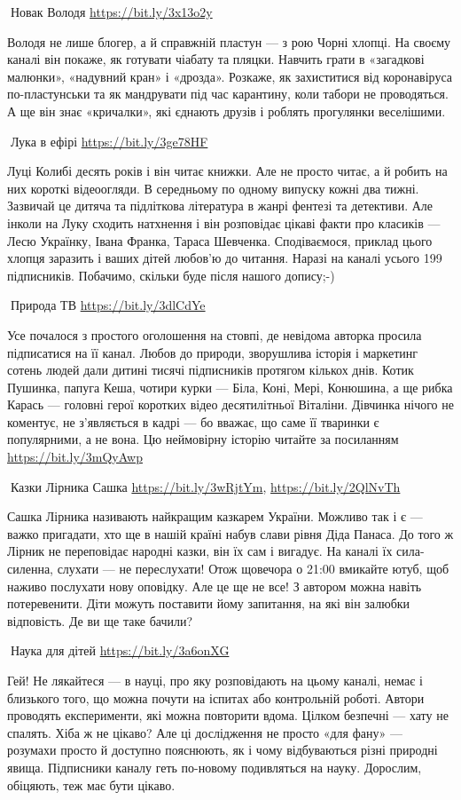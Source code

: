 🦉Новак Володя \url{https://bit.ly/3x13o2y}

Володя не лише блогер, а й справжній пластун — з рою Чорні хлопці. На своєму каналі він покаже, як готувати чіабату та пляцки. Навчить грати в «загадкові малюнки», «надувний кран» і «дрозда». Розкаже, як захиститися від коронавіруса по-пластунськи та як мандрувати під час карантину, коли табори не проводяться. А ще він знає «кричалки», які єднають друзів і роблять прогулянки веселішими.

🦉Лука в ефірі \url{https://bit.ly/3ge78HF}

Луці Колибі десять років і він читає книжки. Але не просто читає, а й робить на них короткі відеоогляди. В середньому по одному випуску кожні два тижні. Зазвичай це дитяча та підліткова література в жанрі фентезі та детективи. Але інколи на Луку сходить натхнення і він розповідає цікаві факти про класиків — Лесю Українку, Івана Франка, Тараса Шевченка. Сподіваємося, приклад цього хлопця заразить і ваших дітей любов’ю до читання. Наразі на каналі усього 199 підписників. Побачимо, скільки буде після нашого допису;-)

🦉Природа ТВ \url{https://bit.ly/3dlCdYe}

Усе почалося з простого оголошення на стовпі, де невідома авторка просила підписатися на її канал. Любов до природи, зворушлива історія і маркетинг сотень людей дали дитині тисячі підписників протягом кількох днів. Котик Пушинка, папуга Кеша, чотири курки — Біла, Коні, Мері, Конюшина, а ще рибка Карась — головні герої коротких відео десятилітньої Віталіни. Дівчинка нічого не коментує, не з’являється в кадрі — бо вважає, що саме її тваринки є популярними, а не вона. Цю неймовірну історію читайте за посиланням \url{https://bit.ly/3mQyAwp}

🦉Казки Лірника Сашка \url{https://bit.ly/3wRjtYm}, \url{https://bit.ly/2QlNvTh}

Сашка Лірника називають найкращим казкарем України. Можливо так і є — важко
пригадати, хто ще в нашій країні набув слави рівня Діда Панаса. До того ж
Лірник не переповідає народні казки, він їх сам і вигадує. На каналі їх
сила-силенна, слухати  — не переслухати! Отож щовечора о 21:00 вмикайте ютуб,
щоб наживо послухати нову оповідку. Але це ще не все! З автором можна навіть
потеревенити. Діти можуть поставити йому запитання, на які він залюбки
відповість. Де ви ще таке бачили?

🦉Наука для дітей \url{https://bit.ly/3a6onXG}

Гей! Не лякайтеся — в науці, про яку розповідають на цьому каналі, немає і
близького того, що можна почути на іспитах або контрольній роботі. Автори
проводять експерименти, які можна повторити вдома. Цілком безпечні — хату не
спалять. Хіба ж не цікаво? Але ці дослідження не просто «для фану» — розумахи
просто й доступно пояснюють, як і чому відбуваються різні природні явища.
Підписники каналу геть по-новому подивляться на науку. Дорослим, обіцяють, теж
має бути цікаво.

